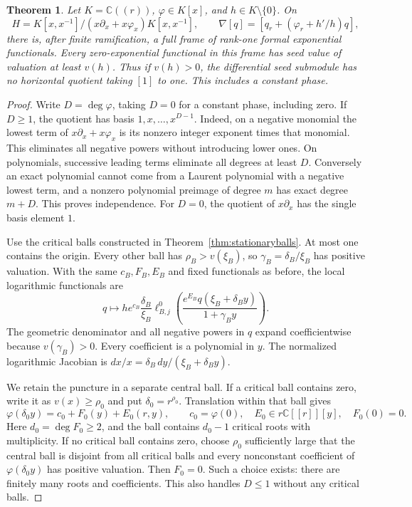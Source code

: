 \documentclass[11pt]{article}
\newtheorem{theorem}{Theorem}[section]
\theoremstyle{definition}\newtheorem{definition}[theorem]{Definition}
\theoremstyle{remark}\newtheorem{remark}[theorem]{Remark}
\newcommand{\C}{\mathbb C}
\begin{document}
\begin{theorem}\label{thm:puncturedpoly}
Let $K=\C((r))$, $\varphi\in K[x]$, and $h\in K\setminus\{0\}$.
On
\[
 H=K[x,x^{-1}]/(x\partial_x+x\varphi_x)K[x,x^{-1}],\qquad
 \nabla[q]=[q_r+(\varphi_r+h'/h)q],
\]
there is, after finite ramification, a full frame of rank-one formal
exponential functionals. Every zero-exponential functional in this
frame has seed value of valuation at least $v(h)$. Thus if $v(h)>0$,
the differential seed submodule has no horizontal quotient taking
$[1]$ to one. This includes a constant phase.
\end{theorem}
\begin{proof}
Write $D=\deg\varphi$, taking $D=0$ for a constant phase, including
zero. If $D\geq1$, the quotient has basis
$1,x,\ldots,x^{D-1}$. Indeed, on a negative monomial the lowest term
of $x\partial_x+x\varphi_x$ is its nonzero integer exponent times
that monomial. This eliminates all negative powers without introducing
lower ones. On polynomials, successive leading terms eliminate all
degrees at least $D$. Conversely an exact polynomial cannot come
from a Laurent polynomial with a negative lowest term, and a nonzero
polynomial preimage of degree $m$ has exact degree $m+D$.
This proves independence. For $D=0$, the quotient of $x\partial_x$
has the single basis element $1$.

Use the critical balls constructed in Theorem~\ref{thm:stationaryballs}.
At most one contains the origin. Every other ball has
$\rho_B>v(\xi_B)$, so $\gamma_B=\delta_B/\xi_B$ has positive
valuation. With the same $c_B,F_B,E_B$ and fixed functionals as before,
the local logarithmic functionals are
\begin{equation}\label{eq:puncturedaway}
 q\longmapsto h e^{c_B}\frac{\delta_B}{\xi_B}
  \ell^0_{B,j}\!\left(
      \frac{e^{E_B}q(\xi_B+\delta_B y)}{1+\gamma_B y}\right).
\end{equation}
The geometric denominator and all negative powers in $q$ expand
coefficientwise because $v(\gamma_B)>0$. Every coefficient is a
polynomial in $y$. The normalized logarithmic Jacobian is
$dx/x=\delta_B\,dy/(\xi_B+\delta_B y)$.

We retain the puncture in a separate central ball. If a critical
ball contains zero, write it as $v(x)\geq\rho_0$ and put
$\delta_0=r^{\rho_0}$. Translation within that ball gives
\[
 \varphi(\delta_0 y)=c_0+F_0(y)+E_0(r,y),\qquad
 c_0=\varphi(0),\quad E_0\in r\C[[r]][y],\quad F_0(0)=0.
\]
Here $d_0=\deg F_0\geq2$, and the ball contains $d_0-1$
critical roots with multiplicity. If no critical ball contains zero,
choose $\rho_0$ sufficiently large that the central ball is disjoint
from all critical balls and every nonconstant coefficient of
$\varphi(\delta_0 y)$ has positive valuation. Then $F_0=0$.
Such a choice exists: there are finitely many roots and coefficients.
This also handles $D\leq1$ without any critical balls.


\end{proof}
\end{document}
